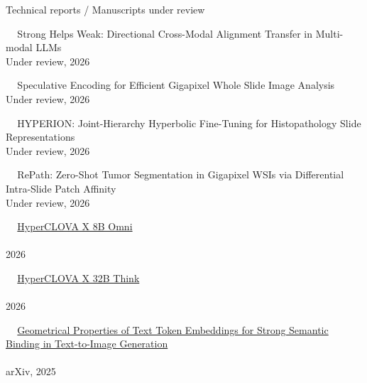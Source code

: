 \documentclass{resume} %
\newcommand{\mycolor}[1]{\textcolor{myurlcolor}{#1}}
\begin{document}
\begin{rSection}{Technical reports / Manuscripts under review}


\textbullet~\,\, {\mycolor{Strong Helps Weak: Directional Cross-Modal Alignment Transfer in Multi-modal LLMs}}
\\ \hspace*{1.5em}Under review, 2026



\textbullet~\,\, {\mycolor{Speculative Encoding for Efficient Gigapixel Whole Slide Image Analysis}}
\\ \hspace*{1.5em}Under review, 2026



\textbullet~\,\, {\mycolor{HYPERION: Joint-Hierarchy Hyperbolic Fine-Tuning for Histopathology Slide Representations}}
\\ \hspace*{1.5em}Under review, 2026



\textbullet~\,\, {\mycolor{RePath: Zero-Shot Tumor Segmentation in Gigapixel WSIs via Differential Intra-Slide Patch Affinity}}
\\ \hspace*{1.5em}Under review, 2026










\textbullet~\,\, \href{https://arxiv.org/pdf/2601.01792}{HyperCLOVA X 8B Omni}
\\ 
\\ \hspace*{1.5em}2026


\textbullet~\,\, \href{https://www.arxiv.org/pdf/2601.03286}{HyperCLOVA X 32B Think}
\\ 
\\ \hspace*{1.5em}2026

\textbullet~\,\, \href{https://arxiv.org/pdf/2503.23011}{Geometrical Properties of Text Token Embeddings for Strong Semantic Binding in Text-to-Image Generation}
\\ 
\\ \hspace*{1.5em}arXiv, 2025



\end{rSection}
\end{document}
